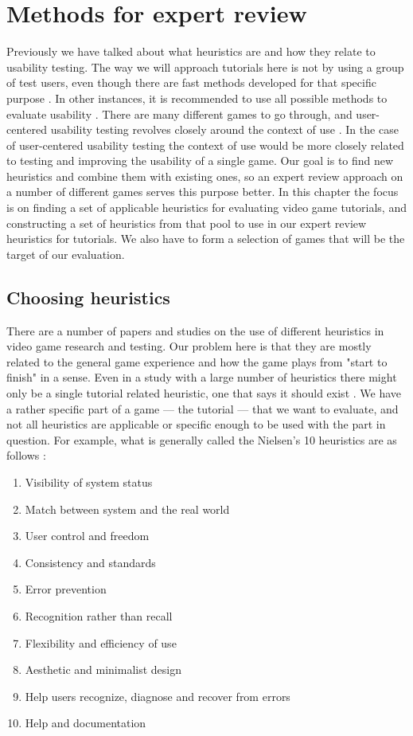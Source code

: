 \chapter{Methods for expert review}
Previously we have talked about what heuristics are and how they relate to usability testing. The way we will approach tutorials here is not by using a group of test users, even though there are fast methods developed for that specific purpose \cite{Kjeldskov2004}. In other instances, it is recommended to use all possible methods to evaluate usability \cite{Schaffer2007}. There are many different games to go through, and user-centered usability testing revolves closely around the context of use \cite{Tarkkanen2013}. In the case of user-centered usability testing the context of use would be more closely related to testing and improving the usability of a single game. Our goal is to find new heuristics and combine them with existing ones, so an expert review approach on a number of different games serves this purpose better. In this chapter the focus is on finding a set of applicable heuristics for evaluating video game tutorials, and constructing a set of heuristics from that pool to use in our expert review heuristics for tutorials. We also have to form a selection of games that will be the target of our evaluation.

\section{Choosing  heuristics}
There are a number of papers and studies on the use of different heuristics in video game research and testing. Our problem here is that they are mostly related to the general game experience and how the game plays from "start to finish" in a sense. Even in a study with a large number of heuristics there might only be a single tutorial related heuristic, one that says it should exist \cite{Almeida2010a}. We have a rather specific part of a game --- the tutorial --- that we want to evaluate, and not all heuristics are applicable or specific enough to be used with the part in question. For example, what is generally called the Nielsen's 10 heuristics are as follows \cite{Nielsen1993}: 

\begin{enumerate}
	\item Visibility of system status
	\item Match between system and the real world
	\item User control and freedom
	\item Consistency and standards
	\item Error prevention
	\item Recognition rather than recall
	\item Flexibility and efficiency of use
	\item Aesthetic and minimalist design
	\item Help users recognize, diagnose and recover from errors
	\item Help and documentation
\end{enumerate}

